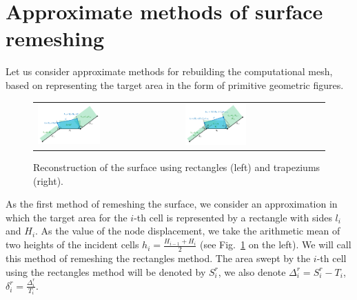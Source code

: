 \documentclass[
11pt,%
tightenlines,%
twoside,%
onecolumn,%
nofloats,%
nobibnotes,%
nofootinbib,%
superscriptaddress,%
noshowpacs,%
centertags]%
{revtex4}
\begin{document}
\section{Approximate methods of surface remeshing}

Let us consider approximate methods for rebuilding the computational mesh, based on representing the target area in the form of primitive geometric figures.

\begin{figure}[ht]
\setcaptionmargin{5mm}
\onelinecaptionstrue  %
\begin{tabular}{ll}
\includegraphics[width=0.45\textwidth]{pics/remesh_rectangles.pdf}
&
\includegraphics[width=0.45\textwidth]{pics/remesh_trapeziums.pdf}
\end{tabular}
\caption{Reconstruction of the surface using rectangles (left) and trapeziums (right).}
\label{fig:text_1_remesh_2d_rectangles_and_trapeziums}
\end{figure}

As the first method of remeshing the surface, we consider an approximation in which the target area for the $i$-th cell is represented by a rectangle with sides $l_i$ and $H_i$.
As the value of the node displacement, we take the arithmetic mean of two heights of the incident cells $h_i = \frac{H_{i - 1} + H_i}{2}$ (see Fig.~\ref{fig:text_1_remesh_2d_rectangles_and_trapeziums} on the left).
We will call this method of remeshing the rectangles method.
The area swept by the $i$-th cell using the rectangles method will be denoted by $S_i^r$, we also denote $\Delta_i^r = S_i^r - T_i$, $\delta_i^r = \frac{\Delta_i^r}{T_i}$.
\end{document}
